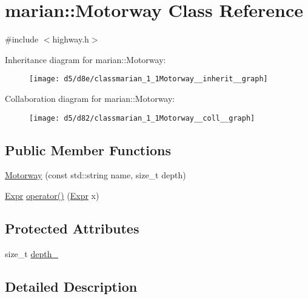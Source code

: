 \hypertarget{classmarian_1_1Motorway}{}\section{marian\+:\+:Motorway Class Reference}
\label{classmarian_1_1Motorway}


{\ttfamily \#include $<$highway.\+h$>$}



Inheritance diagram for marian\+:\+:Motorway\+:
\nopagebreak
\begin{figure}[H]
\begin{center}
\leavevmode
\texttt{[image: d5/d8e/classmarian\_1\_1Motorway\_\_inherit\_\_graph]}
\end{center}
\end{figure}


Collaboration diagram for marian\+:\+:Motorway\+:
\nopagebreak
\begin{figure}[H]
\begin{center}
\leavevmode
\texttt{[image: d5/d82/classmarian\_1\_1Motorway\_\_coll\_\_graph]}
\end{center}
\end{figure}
\subsection*{Public Member Functions}
\begin{DoxyCompactItemize}
\item 
\hyperlink{classmarian_1_1Motorway_a28e881c47337e7d8135d44d800b61c47}{Motorway} (const std\+::string name, size\+\_\+t depth)
\item 
\hyperlink{namespacemarian_a498d8baf75b754011078b890b39c8e12}{Expr} \hyperlink{classmarian_1_1Motorway_a1a6728a3791ca247ec9aa0632673c9ce}{operator()} (\hyperlink{namespacemarian_a498d8baf75b754011078b890b39c8e12}{Expr} x)
\end{DoxyCompactItemize}
\subsection*{Protected Attributes}
\begin{DoxyCompactItemize}
\item 
size\+\_\+t \hyperlink{classmarian_1_1Motorway_a384982b62bfffcef2bc23cbd74ebdf4a}{depth\+\_\+}
\end{DoxyCompactItemize}


\subsection{Detailed Description}



